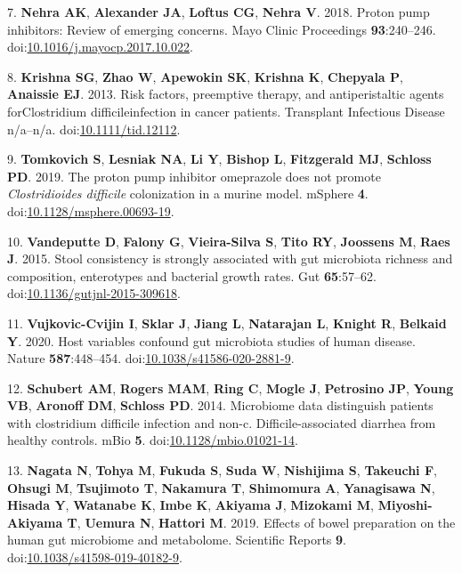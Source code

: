 \documentclass[
  11pt,
]{article}
\begin{document}
\leavevmode\hypertarget{ref-Nehra2018}{}%
7. \textbf{Nehra AK}, \textbf{Alexander JA}, \textbf{Loftus CG},
\textbf{Nehra V}. 2018. Proton pump inhibitors: Review of emerging
concerns. Mayo Clinic Proceedings \textbf{93}:240--246.
doi:\href{https://doi.org/10.1016/j.mayocp.2017.10.022}{10.1016/j.mayocp.2017.10.022}.

\leavevmode\hypertarget{ref-Krishna2013}{}%
8. \textbf{Krishna SG}, \textbf{Zhao W}, \textbf{Apewokin SK},
\textbf{Krishna K}, \textbf{Chepyala P}, \textbf{Anaissie EJ}. 2013.
Risk factors, preemptive therapy, and antiperistaltic agents
forClostridium difficileinfection in cancer patients. Transplant
Infectious Disease n/a--n/a.
doi:\href{https://doi.org/10.1111/tid.12112}{10.1111/tid.12112}.

\leavevmode\hypertarget{ref-Tomkovich2019}{}%
9. \textbf{Tomkovich S}, \textbf{Lesniak NA}, \textbf{Li Y},
\textbf{Bishop L}, \textbf{Fitzgerald MJ}, \textbf{Schloss PD}. 2019.
The proton pump inhibitor omeprazole does not promote
\emph{Clostridioides difficile} colonization in a murine model. mSphere
\textbf{4}.
doi:\href{https://doi.org/10.1128/msphere.00693-19}{10.1128/msphere.00693-19}.

\leavevmode\hypertarget{ref-Vandeputte2015}{}%
10. \textbf{Vandeputte D}, \textbf{Falony G}, \textbf{Vieira-Silva S},
\textbf{Tito RY}, \textbf{Joossens M}, \textbf{Raes J}. 2015. Stool
consistency is strongly associated with gut microbiota richness and
composition, enterotypes and bacterial growth rates. Gut
\textbf{65}:57--62.
doi:\href{https://doi.org/10.1136/gutjnl-2015-309618}{10.1136/gutjnl-2015-309618}.

\leavevmode\hypertarget{ref-VujkovicCvijin2020}{}%
11. \textbf{Vujkovic-Cvijin I}, \textbf{Sklar J}, \textbf{Jiang L},
\textbf{Natarajan L}, \textbf{Knight R}, \textbf{Belkaid Y}. 2020. Host
variables confound gut microbiota studies of human disease. Nature
\textbf{587}:448--454.
doi:\href{https://doi.org/10.1038/s41586-020-2881-9}{10.1038/s41586-020-2881-9}.

\leavevmode\hypertarget{ref-Schubert2014}{}%
12. \textbf{Schubert AM}, \textbf{Rogers MAM}, \textbf{Ring C},
\textbf{Mogle J}, \textbf{Petrosino JP}, \textbf{Young VB},
\textbf{Aronoff DM}, \textbf{Schloss PD}. 2014. Microbiome data
distinguish patients with clostridium difficile infection and non-c.
Difficile-associated diarrhea from healthy controls. mBio \textbf{5}.
doi:\href{https://doi.org/10.1128/mbio.01021-14}{10.1128/mbio.01021-14}.

\leavevmode\hypertarget{ref-Nagata2019}{}%
13. \textbf{Nagata N}, \textbf{Tohya M}, \textbf{Fukuda S}, \textbf{Suda
W}, \textbf{Nishijima S}, \textbf{Takeuchi F}, \textbf{Ohsugi M},
\textbf{Tsujimoto T}, \textbf{Nakamura T}, \textbf{Shimomura A},
\textbf{Yanagisawa N}, \textbf{Hisada Y}, \textbf{Watanabe K},
\textbf{Imbe K}, \textbf{Akiyama J}, \textbf{Mizokami M},
\textbf{Miyoshi-Akiyama T}, \textbf{Uemura N}, \textbf{Hattori M}. 2019.
Effects of bowel preparation on the human gut microbiome and metabolome.
Scientific Reports \textbf{9}.
doi:\href{https://doi.org/10.1038/s41598-019-40182-9}{10.1038/s41598-019-40182-9}.
\end{document}
